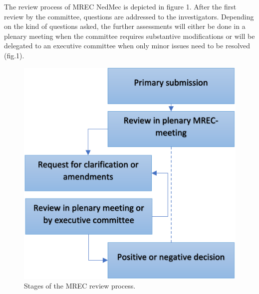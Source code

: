 \documentclass[authordate, empirical]{jote-new-article}
\begin{document}
	The review process of MREC NedMec is depicted in figure 1. After the first review by the committee, questions are addressed to the investigators. Depending on the kind of questions asked, the further assessments will either be done in a plenary meeting when the committee requires substantive modifications or will be delegated to an executive committee when only minor issues need to be resolved (fig.1).







































	













	\begin{figure}
		\begin{fullwidth}
		\includegraphics[width=\linewidth]{media/Picture1.png}

		\caption{Stages of the MREC review process.}
		\end{fullwidth}
	\end{figure}
	
\end{document}
